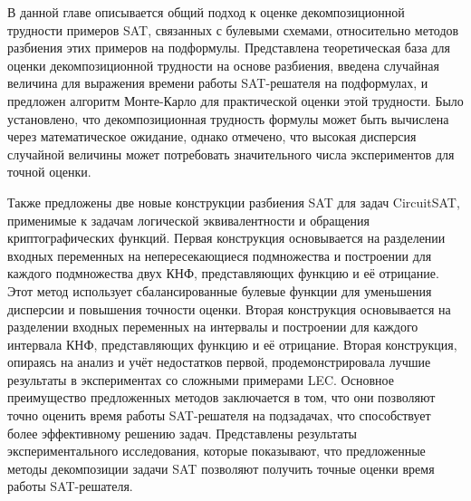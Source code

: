 \chapterconclusion

В данной главе описывается общий подход к оценке декомпозиционной трудности примеров SAT, связанных с булевыми схемами, относительно методов разбиения этих примеров на подформулы.
Представлена теоретическая база для оценки декомпозиционной трудности на основе разбиения, введена случайная величина для выражения времени работы SAT-решателя на подформулах, и предложен алгоритм Монте-Карло для практической оценки этой трудности.
Было установлено, что декомпозиционная трудность формулы может быть вычислена через математическое ожидание, однако отмечено, что высокая дисперсия случайной величины может потребовать значительного числа экспериментов для точной оценки.

Также предложены две новые конструкции разбиения SAT для задач CircuitSAT, применимые к задачам логической эквивалентности и обращения криптографических функций.
Первая конструкция основывается на разделении входных переменных на непересекающиеся подмножества и построении для каждого подмножества двух КНФ, представляющих функцию и её отрицание.
Этот метод использует сбалансированные булевые функции для уменьшения дисперсии и повышения точности оценки.
Вторая конструкция основывается на разделении входных переменных на интервалы и построении для каждого интервала КНФ, представляющих функцию и её отрицание.
Вторая конструкция, опираясь на анализ и учёт недостатков первой, продемонстрировала лучшие результаты в экспериментах со сложными примерами LEC.
Основное преимущество предложенных методов заключается в том, что они позволяют точно оценить время работы SAT-решателя на подзадачах, что способствует более эффективному решению задач.
Представлены результаты экспериментального исследования, которые показывают, что предложенные методы декомпозиции задачи SAT позволяют получить точные оценки время работы SAT-решателя.
